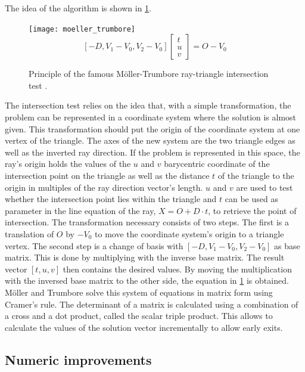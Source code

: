 The idea of the algorithm is shown in \cref{fig:ray_triangle_intersect}.
%
\begin{figure}
	\centering
	\texttt{[image: moeller\_trumbore]}
	\begin{equation*}
		\left[-D, V_1 - V_0, V_2 - V_0 \right] \left[ \begin{array}{c} t \\ u \\ v \end{array} \right] = O - V_0
	\end{equation*}
	\caption[Möller-Trumbore ray-triangle intersection test]{
		Principle of the famous Möller-Trumbore ray-triangle intersection test \cite{enlight_demo_workshop}.
	}
	\label{fig:ray_triangle_intersect}
\end{figure}
%
The intersection test relies on the idea that, with a simple transformation, the problem can be represented in a coordinate system where the solution is almost given.
This transformation should put the origin of the coordinate system at one vertex of the triangle.
The axes of the new system are the two triangle edges as well as the inverted ray direction.
If the problem is represented in this space, the ray's origin holds the values of the $u$ and $v$ barycentric coordinate of the intersection point on the triangle as well as the distance $t$ of the triangle to the origin in multiples of the ray direction vector's length.
$u$ and $v$ are used to test whether the intersection point lies within the triangle and $t$ can be used as parameter in the line equation of the ray, $X = O + D \cdot t$, to retrieve the point of intersection.
The transformation necessary consists of two steps.
The first is a translation of $O$ by $-V_0$ to move the coordinate system's origin to a triangle vertex.
The second step is a change of basis with $\left[-D, V_1 - V_0, V_2 - V_0 \right]$ as base matrix.
This is done by multiplying with the inverse base matrix.
The result vector $\left[ t,  u,  v \right]$ then contains the desired values.
By moving the multiplication with the inversed base matrix to the other side, the equation in \cref{fig:ray_triangle_intersect} is obtained.
Möller and Trumbore solve this system of equations in matrix form using Cramer's rule.
The determinant of a matrix is calculated using a combination of a cross and a dot product, called the scalar triple product.
This allows to calculate the values of the solution vector incrementally to allow early exits.


\subsection{Numeric improvements}
\label{sec:numeric_improvements}

